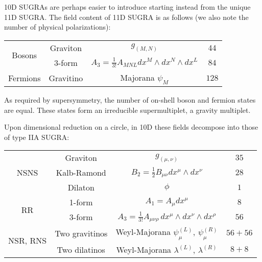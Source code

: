 10D SUGRAs are perhaps easier to introduce starting instead from the unique 11D SUGRA. The field content of 11D SUGRA is as follows (we also note the number of physical polarizations):



\begin{center}
	\begin{tabular}{|c|c|c|c|}
		\hline
		\multirow{2}{*}{Bosons} &
		Graviton	& $g_{(M,N)}$ 							& $44$\\
		&3-form		& $A_3 = \frac{1}{3!} A_{MNL} dx^M \wedge dx^N \wedge dx^L$	& $84$\\
		\hline \hline 
		
		Fermions & Gravitino	& Majorana $\psi_M$ 						& $128$\\
		\hline
	\end{tabular}
\end{center}

As required by supersymmetry, the number of on-shell boson and fermion states are equal. These states form an irreducible supermultiplet, a gravity multiplet.

Upon dimensional reduction on a circle, in 10D these fields decompose into those of type IIA SUGRA:

%

\begin{center}
	\begin{tabular}{|c|c|c|c|}
		\hline
		\multirow{3}{*}{NSNS} 
	&	Graviton	& $g_{(\mu,\nu)}$ 							& $35$\\
	&	Kalb-Ramond	& $B_2 = \frac{1}{2} B_{\mu\nu} dx^\mu \wedge dx^\nu$ & $28$ \\
	&	Dilaton & $\phi$ & $1$ \\
		\hline \hline
		\multirow{2}{*}{RR} 
	&	1-form		& $A_1 = A_{\mu} dx^\mu$ & $8$\\
	&	3-form		& $A_3 = \frac{1}{3!} A_{\mu\nu\rho} \, dx^\mu \wedge dx^\nu \wedge dx^\rho$ & $56$\\
		\hline \hline 
		\multirow{2}{*}{NSR, RNS}
	&	Two gravitinos	& Weyl-Majorana $\psi_\mu^{(L)}$, $\psi_\mu^{(R)}$ 	& $56+56$\\
	&	Two dilatinos	& Weyl-Majorana $\lambda^{(L)}$, $\lambda^{(R)}$ 	& $8+8$\\
		\hline
	\end{tabular}
\end{center}

